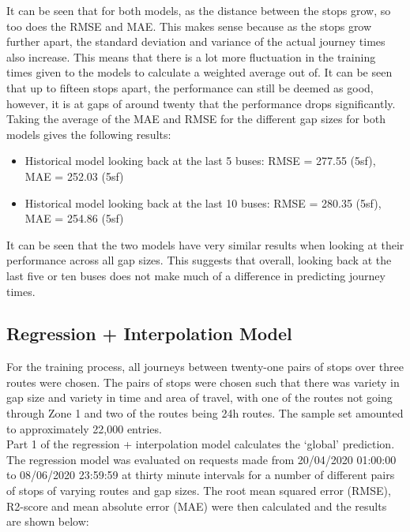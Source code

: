 It can be seen that for both models, as the distance between the stops grow, so too does the RMSE and MAE. This makes sense because as the stops grow further apart, the standard deviation and variance of the actual journey times also increase. This means that there is a lot more fluctuation in the training times given to the models to calculate a weighted average out of. It can be seen that up to fifteen stops apart, the performance can still be deemed as good, however, it is at gaps of around twenty that the performance drops significantly.  \\

Taking the average of the MAE and RMSE for the different gap sizes for both models gives the following results: 

\begin{itemize}
    \item Historical model looking back at the last 5 buses: RMSE = 277.55 (5sf), MAE = 252.03 (5sf)
    \item Historical model looking back at the last 10 buses: RMSE = 280.35 (5sf), MAE = 254.86 (5sf)
\end{itemize}

It can be seen that the two models have very similar results when looking at their performance across all gap sizes. This suggests that overall, looking back at the last five or ten buses does not make much of a difference in predicting journey times. 

\subsection{Regression + Interpolation Model}

For the training process, all journeys between twenty-one pairs of stops over three routes were chosen. The pairs of stops were chosen such that there was variety in gap size and variety in time and area of travel, with one of the routes not going through Zone 1 and two of the routes being 24h routes. The sample set amounted to approximately 22,000 entries. \\

Part 1 of the regression + interpolation model calculates the `global' prediction. The regression model was evaluated on requests made from 20/04/2020 01:00:00 to 08/06/2020 23:59:59 at thirty minute intervals for a number of different pairs of stops of varying routes and gap sizes. The root mean squared error (RMSE), R2-score and mean absolute error (MAE) were then calculated and the results are shown below:

